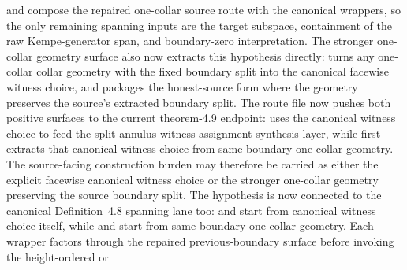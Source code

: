 \documentclass[11pt]{article}
\begin{document}
\begin{itemize}
and
compose the repaired one-collar source route with the canonical
 wrappers, so the only remaining
spanning inputs are the target subspace, containment of the raw Kempe-generator
span, and boundary-zero interpretation.
The stronger
one-collar geometry surface also now
extracts this hypothesis directly:
turns any one-collar collar geometry with the fixed boundary split into the
canonical facewise witness choice, and
packages the honest-source form where the geometry preserves the source's
extracted boundary split.  The route file now pushes both positive surfaces to
the current theorem-4.9 endpoint:
uses the canonical witness choice to feed the split annulus witness-assignment
synthesis layer, while
first extracts that canonical witness choice from same-boundary one-collar
geometry.  The source-facing construction burden may therefore be carried as
either the explicit facewise canonical witness choice or the stronger
one-collar geometry preserving the source boundary split.  The hypothesis is
now connected to the canonical Definition~4.8 spanning lane too:
and
start from canonical witness choice itself, while
and
start from same-boundary one-collar geometry.  Each wrapper factors through
the repaired previous-boundary surface before invoking the height-ordered or

\end{itemize}
\end{document}
